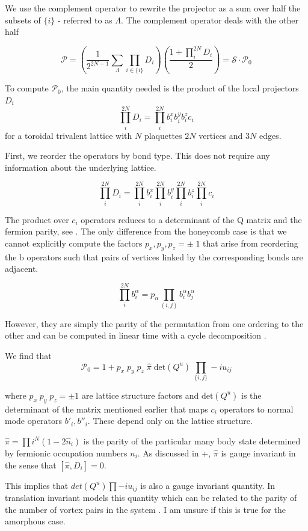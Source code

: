 We use the complement operator to rewrite the projector as a sum over half the subsets of \(\{i\}\) - referred to as \(\Lambda\). The complement operator deals with the other half

\[ \mathcal{P} =  \left( \frac{1}{2^{2N-1}} \sum_{\Lambda} \prod_{i\in\{i\}} D_i\right) \left(\frac{1 + \prod_i^{2N} D_i}{2}\right) = \mathcal{S} \cdot \mathcal{P}_0\]

To compute \(\mathcal{P}_0\), the main quantity needed is the product of the local projectors \(D_i\) \[\prod_i^{2N} D_i = \prod_i^{2N} b^x_i b^y_i b^z_i c_i \] for a toroidal trivalent lattice with \(N\) plaquettes \(2N\) vertices and \(3N\) edges.

First, we reorder the operators by bond type. This does not require any information about the underlying lattice.

\[\prod_i^{2N} D_i = \prod_i^{2N} b^x_i \prod_i^{2N} b^y_i \prod_i^{2N} b^z_i \prod_i^{2N} c_i\]

The product over \(c_i\) operators reduces to a determinant of the Q matrix and the fermion parity, see \textcite{pedrocchiPhysicalSolutionsKitaev2011b}. The only difference from the honeycomb case is that we cannot explicitly compute the factors \(p_x,p_y,p_z = \pm\;1\) that arise from reordering the b operators such that pairs of vertices linked by the corresponding bonds are adjacent.

\[\prod_i^{2N} b^\alpha_i = p_\alpha \prod_{(i,j)}b^\alpha_i b^\alpha_j\]

However, they are simply the parity of the permutation from one ordering to the other and can be computed in linear time with a cycle decomposition \textcite{app:cycle_decomp}.

We find that \[\mathcal{P}_0 = 1 + p_x\;p_y\;p_z\; \hat{\pi} \; \mathrm{det}(Q^u) \; \prod_{\{i,j\}} -iu_{ij}\]

where \(p_x\;p_y\;p_z = \pm 1\) are lattice structure factors and \(\mathrm{det}(Q^u)\) is the determinant of the matrix mentioned earlier that maps \(c_i\) operators to normal mode operators \(b'_i, b''_i\). These depend only on the lattice structure.

\(\hat{\pi} = \prod{i}^{N} (1 - 2\hat{n}_i)\) is the parity of the particular many body state determined by fermionic occupation numbers \(n_i\). As discussed in +\textcite{pedrocchiPhysicalSolutionsKitaev2011b}, \(\hat{\pi}\) is gauge invariant in the sense that \([\hat{\pi}, D_i] = 0\).

This implies that \(det(Q^u) \prod -i u_{ij}\) is also a gauge invariant quantity. In translation invariant models this quantity which can be related to the parity of the number of vortex pairs in the system \textcite{yaoAlgebraicSpinLiquid2009}. I am unsure if this is true for the amorphous case.

